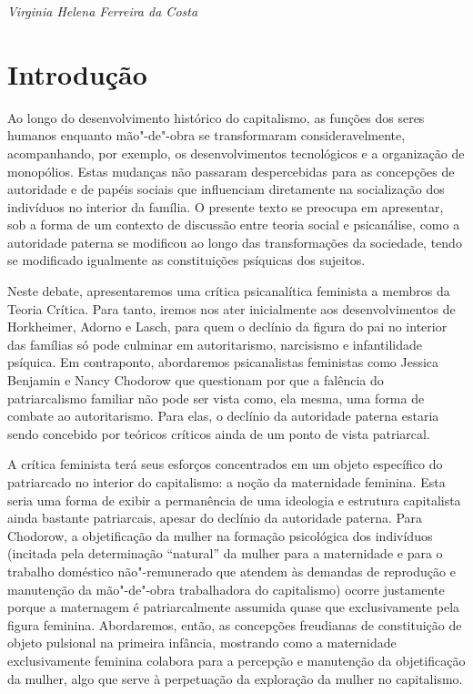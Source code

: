 \begin{flushright}
\emph{Virginia Helena Ferreira da Costa}
\end{flushright}

\section{Introdução}

Ao longo do desenvolvimento histórico do capitalismo, as funções dos
seres humanos enquanto mão"-de"-obra se transformaram consideravelmente,
acompanhando, por exemplo, os desenvolvimentos tecnológicos e a
organização de monopólios. Estas mudanças não passaram despercebidas
para as concepções de autoridade e de papéis sociais que influenciam
diretamente na socialização dos indivíduos no interior da família. O
presente texto se preocupa em apresentar, sob a forma de um contexto de
discussão entre teoria social e psicanálise, como a autoridade paterna
se modificou ao longo das transformações da sociedade, tendo se
modificado igualmente as constituições psíquicas dos sujeitos.

Neste debate, apresentaremos uma crítica psicanalítica feminista a
membros da Teoria Crítica. Para tanto, iremos nos ater inicialmente aos
desenvolvimentos de Horkheimer, Adorno e Lasch, para quem o declínio da
figura do pai no interior das famílias só pode culminar em
autoritarismo, narcisismo e infantilidade psíquica. Em contraponto,
abordaremos psicanalistas feministas como Jessica Benjamin e Nancy
Chodorow que questionam por que a falência do patriarcalismo familiar
não pode ser vista como, ela mesma, uma forma de combate ao
autoritarismo. Para elas, o declínio da autoridade paterna estaria sendo
concebido por teóricos críticos ainda de um ponto de vista patriarcal.

A crítica feminista terá seus esforços concentrados em um objeto
específico do patriarcado no interior do capitalismo: a noção da
maternidade feminina. Esta seria uma forma de exibir a permanência de
uma ideologia e estrutura capitalista ainda bastante patriarcais, apesar
do declínio da autoridade paterna. Para Chodorow, a objetificação da
mulher na formação psicológica dos indivíduos (incitada pela
determinação ``natural'' da mulher para a maternidade e para o trabalho
doméstico não"-remunerado que atendem às demandas de reprodução e
manutenção da mão"-de"-obra trabalhadora do capitalismo) ocorre justamente
porque a maternagem é patriarcalmente assumida quase que exclusivamente
pela figura feminina. Abordaremos, então, as concepções freudianas de
constituição de objeto pulsional na primeira infância, mostrando como a
maternidade exclusivamente feminina colabora para a percepção e
manutenção da objetificação da mulher, algo que serve à perpetuação da
exploração da mulher no capitalismo.

